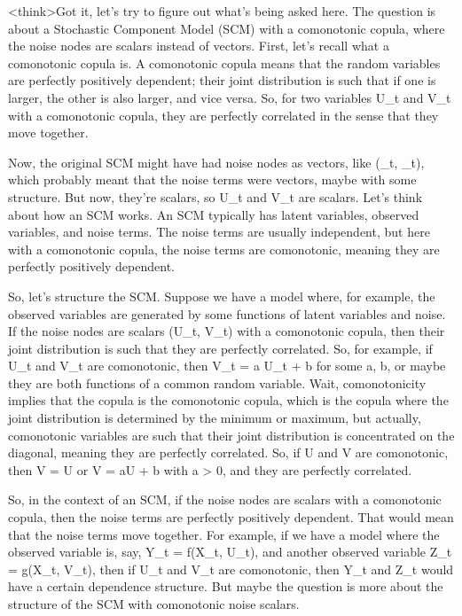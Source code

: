 <think>Got it, let's try to figure out what's being asked here. The question is about a Stochastic Component Model (SCM) with a comonotonic copula, where the noise nodes are scalars instead of vectors. First, let's recall what a comonotonic copula is. A comonotonic copula means that the random variables are perfectly positively dependent; their joint distribution is such that if one is larger, the other is also larger, and vice versa. So, for two variables U_t and V_t with a comonotonic copula, they are perfectly correlated in the sense that they move together.

Now, the original SCM might have had noise nodes as vectors, like (_t, _t), which probably meant that the noise terms were vectors, maybe with some structure. But now, they're scalars, so U_t and V_t are scalars. Let's think about how an SCM works. An SCM typically has latent variables, observed variables, and noise terms. The noise terms are usually independent, but here with a comonotonic copula, the noise terms are comonotonic, meaning they are perfectly positively dependent.

So, let's structure the SCM. Suppose we have a model where, for example, the observed variables are generated by some functions of latent variables and noise. If the noise nodes are scalars (U_t, V_t) with a comonotonic copula, then their joint distribution is such that they are perfectly correlated. So, for example, if U_t and V_t are comonotonic, then V_t = a U_t + b for some a, b, or maybe they are both functions of a common random variable. Wait, comonotonicity implies that the copula is the comonotonic copula, which is the copula where the joint distribution is determined by the minimum or maximum, but actually, comonotonic variables are such that their joint distribution is concentrated on the diagonal, meaning they are perfectly correlated. So, if U and V are comonotonic, then V = U or V = aU + b with a > 0, and they are perfectly correlated.

So, in the context of an SCM, if the noise nodes are scalars with a comonotonic copula, then the noise terms are perfectly positively dependent. That would mean that the noise terms move together. For example, if we have a model where the observed variable is, say, Y_t = f(X_t, U_t), and another observed variable Z_t = g(X_t, V_t), then if U_t and V_t are comonotonic, then Y_t and Z_t would have a certain dependence structure. But maybe the question is more about the structure of the SCM with comonotonic noise scalars.


